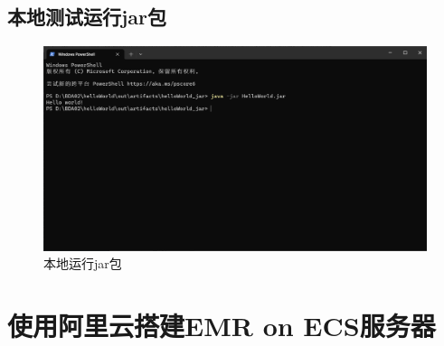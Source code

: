 \subsection{本地测试运行jar包}
\begin{figure}[H]
  \centering
  \includegraphics[width=\textwidth]{figure/test.png}
  \caption{本地运行jar包}
  \label{fig:my_label}
\end{figure}

\section{使用阿里云搭建EMR on ECS服务器}
